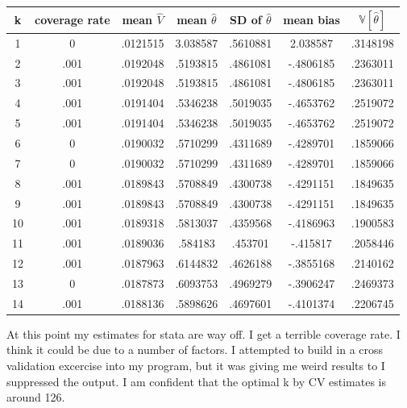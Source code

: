 \documentclass[12pt]{article}
\newcommand{\V}{\mathbb{V}}
\begin{document}
\center
\begin{tabular}{|c|c|c|c|c|c|c||}
\hline
k   &   coverage rate   &   mean $\hat{V}$   &  mean $\hat{\theta}$     &   SD of $\hat{\theta}$  &   mean bias   &   $\V[\hat{\theta}]$  \\
\hline
1   &   0   &   .0121515   &   3.038587   &   .5610881   &   2.038587   &   .3148198 \\
2   &   .001   &   .0192048   &   .5193815   &   .4861081   &   -.4806185   &   .2363011 \\
3   &   .001   &   .0192048   &   .5193815   &   .4861081   &   -.4806185   &   .2363011 \\
4   &   .001   &   .0191404   &   .5346238   &   .5019035   &   -.4653762   &   .2519072 \\
5   &   .001   &   .0191404   &   .5346238   &   .5019035   &   -.4653762   &   .2519072 \\
6   &   0   &   .0190032   &   .5710299   &   .4311689   &   -.4289701   &   .1859066 \\
7   &   0   &   .0190032   &   .5710299   &   .4311689   &   -.4289701   &   .1859066 \\
8   &   .001   &   .0189843   &   .5708849   &   .4300738   &   -.4291151   &   .1849635 \\
9   &   .001   &   .0189843   &   .5708849   &   .4300738   &   -.4291151   &   .1849635 \\
10   &   .001   &   .0189318   &   .5813037   &   .4359568   &   -.4186963   &   .1900583 \\
11   &   .001   &   .0189036   &   .584183   &   .453701   &   -.415817   &   .2058446 \\
12   &   .001   &   .0187963   &   .6144832   &   .4626188   &   -.3855168   &   .2140162 \\
13   &   0   &   .0187873   &   .6093753   &   .4969279   &   -.3906247   &   .2469373 \\
14   &   .001   &   .0188136   &   .5898626   &   .4697601   &   -.4101374   &   .2206745 \\
\hline
\hline
\end{tabular}

At this point my estimates for stata are way off. I get a terrible coverage rate. I think it could be due to a number of factors. I attempted to build in a cross validation excercise into my program, but it was giving me weird results to I suppressed the output. I am confident that the optimal k by CV estimates is around 126.
\end{document}
